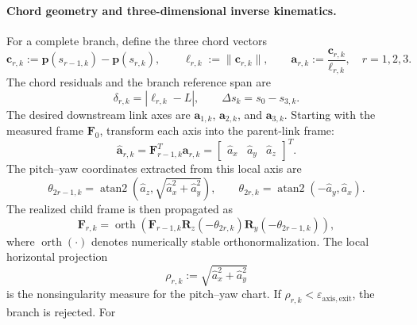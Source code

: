 \documentclass[12pt,a4paper]{report}
\begin{document}
\paragraph{Chord geometry and three-dimensional inverse kinematics.}
For a complete branch, define the three chord vectors
\begin{equation}
\mathbf{c}_{r,k}:=\mathbf{p}(s_{r-1,k})-\mathbf{p}(s_{r,k}),
\qquad
\ell_{r,k}:=\|\mathbf{c}_{r,k}\|,
\qquad
\mathbf{a}_{r,k}:=\frac{\mathbf{c}_{r,k}}{\ell_{r,k}},
\quad r=1,2,3 .
\tag{8.97}
\label{eq:ch8-chord-geometry}
\end{equation}
The chord residuals and the branch reference span are
\begin{equation}
\delta_{r,k}=|\ell_{r,k}-L|,
\qquad
\Delta s_k=s_0-s_{3,k}.
\tag{8.98}
\label{eq:ch8-branch-residual}
\end{equation}
The desired downstream link axes are $\mathbf{a}_{1,k}$,
$\mathbf{a}_{2,k}$, and $\mathbf{a}_{3,k}$. Starting with the measured
frame $\mathbf{F}_0$, transform each axis into the parent-link frame:
\begin{equation}
\widehat{\mathbf{a}}_{r,k}
=\mathbf{F}_{r-1,k}^{T}\mathbf{a}_{r,k}
=\begin{bmatrix}\widehat a_x&\widehat a_y&\widehat a_z\end{bmatrix}^{T}.
\tag{8.99}
\label{eq:ch8-local-axis}
\end{equation}
The pitch--yaw coordinates extracted from this local axis are
\begin{equation}
\theta_{2r-1,k}
=\operatorname{atan2}\!\left(\widehat a_z,
\sqrt{\widehat a_x^2+\widehat a_y^2}\right),
\qquad
\theta_{2r,k}
=\operatorname{atan2}(-\widehat a_y,\widehat a_x).
\tag{8.100}
\label{eq:ch8-ik-angle-extraction}
\end{equation}
The realized child frame is then propagated as
\begin{equation}
\mathbf{F}_{r,k}
=\operatorname{orth}\!\left(
\mathbf{F}_{r-1,k}\mathbf{R}_z(-\theta_{2r,k})
\mathbf{R}_y(-\theta_{2r-1,k})\right),
\tag{8.101}
\label{eq:ch8-frame-propagation}
\end{equation}
where $\operatorname{orth}(\cdot)$ denotes numerically stable
orthonormalization. The local horizontal projection
\begin{equation}
\rho_{r,k}:=\sqrt{\widehat a_x^2+\widehat a_y^2}
\tag{8.102}
\label{eq:ch8-axis-projection}
\end{equation}
is the nonsingularity measure for the pitch--yaw chart. If
$\rho_{r,k}<\varepsilon_{\mathrm{axis,exit}}$, the branch is rejected. For
\end{document}
